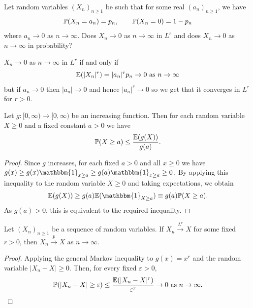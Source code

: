 \documentclass[10pt, a4paper]{article}
\begin{document}
\begin{example}
    Let random variables $(X_n)_{n \geq 1}$ be such that for some real $(a_n)_{n \geq 1}$,
    we have
    \[
    \P(X_n = a_n) = p_n,\qquad \P(X_n = 0) = 1 - p_n
    \]
    where $a_n \to 0$ as $n \to \infty$.
    Does $X_n \to 0$ as $n \to \infty$ in $L ^ r$ and does $X_n \to 0$ as $n \to \infty$ in probability?

    \begin{solution}
        $X_n \to 0$ as $n \to \infty$ in $L ^ r$ if and only if
        \[
        \E(|X_n| ^ r) = |a_n| ^ rp_n \to 0\text{ as } n \to \infty
        \]
        but if $a_n \to 0$ then $|a_n| \to 0$ and hence $|a_n| ^ r \to 0$ so we get that it converges in $L ^ r$ for $r > 0$.
    \end{solution}
\end{example}

\begin{lemma}
    Let $g : [0, \infty) \to [0, \infty)$ be an increasing function.
    Then for each random variable $X \geq 0$ and a fixed constant $a > 0$ we have
    \[
    \P(X \geq a) \leq \frac{\E(g(X))}{g(a)}.
    \]

    \begin{proof}
        Since $g$ increases,
        for each fixed $a > 0$ and all $x \geq 0$ we have $g(x) \geq g(x)\mathbbm{1}_{x \geq a} \geq g(a)\mathbbm{1}_{x \geq a} \geq 0$.
        By applying this inequality to the random variable $X \geq 0$ and taking expectations,
        we obtain
        \[
        \E(g(X)) \geq g(a)\E(\mathbbm{1}_{X \geq a}) \equiv g(a)\P(X \geq a).
        \]
        As $g(a) > 0$,
        this is equivalent to the required inequality.
    \end{proof}
\end{lemma}

\begin{lemma}
    Let $(X_n)_{n \geq 1}$ be a sequence of random variables.
    If $X_n \overset{L ^ r}{\to} X$ for some fixed $r > 0$,
    then $X_n \overset{p}{\to} X$ as $n \to \infty$.

    \begin{proof}
        Applying the general Markov inequality to $g(x) = x ^ r$ and the random variable $|X_n - X| \geq 0$.
        Then,
        for every fixed $\varepsilon > 0$,
        \[
        \P(|X_n - X| \geq \varepsilon) \leq \frac{\E(|X_n - X| ^ r)}{\varepsilon ^ r} \to 0\text{ as } n \to \infty.
        \]
    \end{proof}
\end{lemma}
\end{document}
